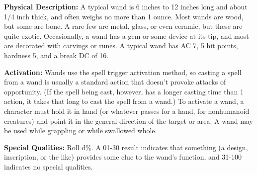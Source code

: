 \documentclass{article}
\begin{document}
\textbf{Physical Description:} A typical wand is 6 inches to 12 inches long and 
about 1/4 inch thick, and often weighs no more than 1 ounce. Most wands are wood, 
but some are bone. A rare few are metal, glass, or even ceramic, but these are 
quite exotic. Occasionally, a wand has a gem or some device at its tip, and most 
are decorated with carvings or runes. A typical wand has AC 7, 5 hit points, hardness 
5, and a break DC of 16.

\textbf{Activation:} Wands use the spell trigger activation method, so casting 
a spell from a wand is usually a standard action that doesn't provoke attacks of 
opportunity. (If the spell being cast, however, has a longer casting time than 
1 action, it takes that long to cast the spell from a wand.) To activate a wand, 
a character must hold it in hand (or whatever passes for a hand, for nonhumanoid 
creatures) and point it in the general direction of the target or area. A wand 
may be used while grappling or while swallowed whole.

\textbf{Special Qualities:} Roll d\%. A 01-30 result indicates that something (a 
design, inscription, or the like) provides some clue to the wand's function, and 
31-100 indicates no special qualities.
\end{document}
